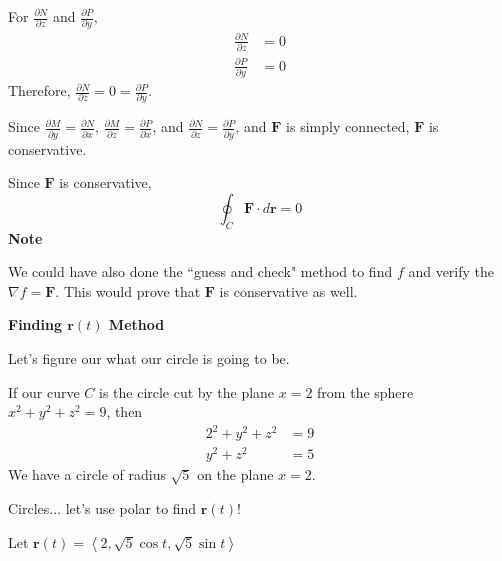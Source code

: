 \documentclass{article}
\newcommand{\lra}[1]{\left\langle #1 \right\rangle}
\renewcommand{\r}[0]{\mathbf{r}}
\newcommand{\F}[0]{\mathbf{F}}
\begin{document}
{}
For $\displaystyle \frac{\partial N}{\partial z}$ and $\displaystyle\frac{\partial P}{\partial y}$,
\begin{align*}
    \frac{\partial N}{\partial z}&=0\\
    \frac{\partial P}{\partial y}&=0
\end{align*}
Therefore, $\displaystyle \frac{\partial N}{\partial z}=0=\displaystyle\frac{\partial P}{\partial y}$.

Since $\displaystyle \frac{\partial M}{\partial y}=\frac{\partial N}{\partial x}$, $\displaystyle \frac{\partial M}{\partial z}=\frac{\partial P}{\partial x}$, and $\displaystyle \frac{\partial N}{\partial z}=\frac{\partial P}{\partial y}$, and $\F$ is simply connected, $\F$ is conservative.

Since $\F$ is conservative,
\begin{equation*}
   \boxed{ \oint_C \F\cdot d\r=0}
\end{equation*}
\textbf{Note}

We could have also done the ``guess and check" method to find $f$ and verify the $\nabla f = \F$. This would prove that $\F$ is conservative as well.

{}
\textbf{Finding $\r(t)$ Method}

Let's figure our what our circle is going to be.

If our curve $C$ is the circle cut by the plane $x=2$ from the sphere $x^2+y^2+z^2=9$, then
\begin{align*}
    2^2+y^2+z^2&=9\\
    y^2+z^2&=5
\end{align*}
We have a circle of radius $\sqrt{5}$ on the plane $x=2$.

Circles... let's use polar to find $\r(t)$!

Let $\r(t)=\lra{2, \sqrt{5}\cos t,\sqrt{5}\sin t}$
\end{document}
